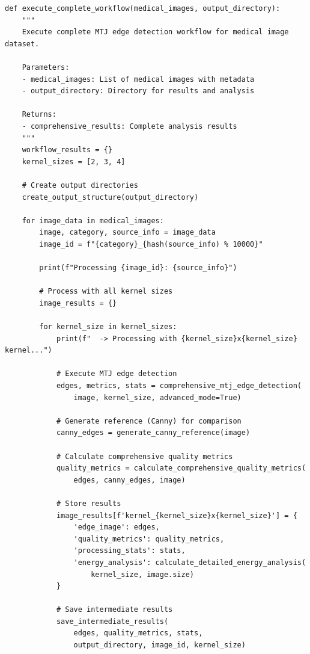 \documentclass[conference]{IEEEtran}
\begin{document}
\begin{lstlisting}[caption={Complete workflow management system}]
def execute_complete_workflow(medical_images, output_directory):
    """
    Execute complete MTJ edge detection workflow for medical image dataset.
    
    Parameters:
    - medical_images: List of medical images with metadata
    - output_directory: Directory for results and analysis
    
    Returns:
    - comprehensive_results: Complete analysis results
    """
    workflow_results = {}
    kernel_sizes = [2, 3, 4]
    
    # Create output directories
    create_output_structure(output_directory)
    
    for image_data in medical_images:
        image, category, source_info = image_data
        image_id = f"{category}_{hash(source_info) % 10000}"
        
        print(f"Processing {image_id}: {source_info}")
        
        # Process with all kernel sizes
        image_results = {}
        
        for kernel_size in kernel_sizes:
            print(f"  -> Processing with {kernel_size}x{kernel_size} kernel...")
            
            # Execute MTJ edge detection
            edges, metrics, stats = comprehensive_mtj_edge_detection(
                image, kernel_size, advanced_mode=True)
            
            # Generate reference (Canny) for comparison
            canny_edges = generate_canny_reference(image)
            
            # Calculate comprehensive quality metrics
            quality_metrics = calculate_comprehensive_quality_metrics(
                edges, canny_edges, image)
            
            # Store results
            image_results[f'kernel_{kernel_size}x{kernel_size}'] = {
                'edge_image': edges,
                'quality_metrics': quality_metrics,
                'processing_stats': stats,
                'energy_analysis': calculate_detailed_energy_analysis(
                    kernel_size, image.size)
            }
            
            # Save intermediate results
            save_intermediate_results(
                edges, quality_metrics, stats, 
                output_directory, image_id, kernel_size)
        

\end{lstlisting}
\end{document}
